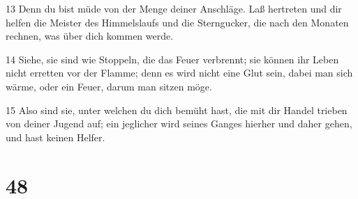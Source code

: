 \par 13 Denn du bist müde von der Menge deiner Anschläge. Laß hertreten und dir helfen die Meister des Himmelslaufs und die Sterngucker, die nach den Monaten rechnen, was über dich kommen werde.
\par 14 Siehe, sie sind wie Stoppeln, die das Feuer verbrennt; sie können ihr Leben nicht erretten vor der Flamme; denn es wird nicht eine Glut sein, dabei man sich wärme, oder ein Feuer, darum man sitzen möge.
\par 15 Also sind sie, unter welchen du dich bemüht hast, die mit dir Handel trieben von deiner Jugend auf; ein jeglicher wird seines Ganges hierher und daher gehen, und hast keinen Helfer.

\chapter{48}

